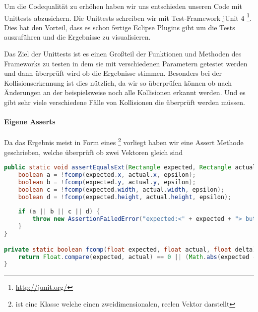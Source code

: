 
Um die Codequalität zu erhöhen haben wir uns entschieden unseren Code mit Unittests abzusichern.
Die Unittests schreiben wir mit Test-Framework jUnit 4 \footnote{\url{http://junit.org/}}. Dies hat den Vorteil, dass es schon fertige Eclipse Plugins gibt um die Tests auszuführen und die Ergebnisse zu visualisieren.


Das Ziel der Unittests ist es einen Großteil der Funktionen und Methoden des Frameworks zu testen in dem sie mit verschiedenen Parametern getestet werden und dann überprüft wird ob die Ergebnisse stimmen. \cite[S 62]{JUNIT}
Besonders bei der Kollisionserkennung ist dies nützlich, da wir so überprüfen können ob nach Änderungen an der  beispielsweise noch alle Kollisionen erkannt werden. Und es gibt sehr viele verschiedene Fälle von Kollisionen die überprüft werden müssen.

\paragraph{Eigene Asserts}

Da das Ergebnis meist in Form eines \footnote{ ist eine Klasse welche einen zweidimensionalen, reelen Vektor darstellt} vorliegt haben wir eine Assert Methode geschrieben, welche überprüft ob zwei Vektoren gleich sind

\doinline
\begin{lstlisting}[caption=Eine Assert Methode für zwei Vektoren, title=\hspace{0 pt}, language=java]
public static void assertEqualsExt(Rectangle expected, Rectangle actual, float epsilon) {
	boolean a = !fcomp(expected.x, actual.x, epsilon);
	boolean b = !fcomp(expected.y, actual.y, epsilon);
	boolean c = !fcomp(expected.width, actual.width, epsilon);
	boolean d = !fcomp(expected.height, actual.height, epsilon);
	
	if (a || b || c || d) {
		throw new AssertionFailedError("expected:<" + expected + "> but was:<" + actual + ">" );
	}
}

private static boolean fcomp(float expected, float actual, float delta) {
	return Float.compare(expected, actual) == 0 || (Math.abs(expected - actual) <= delta);
}
\end{lstlisting}

